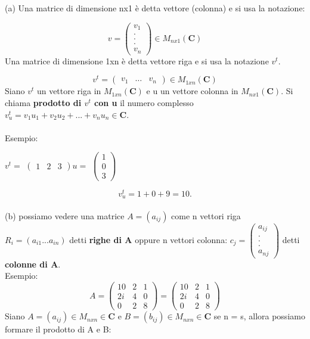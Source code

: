\documentclass[12pt]{article}
\begin{document}
(a) Una matrice di dimensione nx1 è detta vettore (colonna) e si usa la notazione:

\[v = \begin{pmatrix}
    v_1\\
    .\\
    .\\
    .\\
    v_n
\end{pmatrix} \in M_{nx1} (\mathbf{C})\]
Una matrice di dimensione 1xn è detta vettore riga e si usa la notazione $v^t$.

\[v^t = \begin{pmatrix}
    v_1 & \dots & v_n
\end{pmatrix} \in M_{1xn} (\mathbf{C})\]
Siano $v^t$ un vettore riga in $M_{1xn} (\mathbf{C})$ e u un vettore colonna in $M_{nx1} (\mathbf{C})$. Si chiama \textbf{prodotto di $v^t$ con u} il numero complesso $v^t_u = v_1u_1 + v_2u_2 + ... + v_nu_n \in \mathbf{C}$.
\\\\
Esempio:

\begin{center}
$v^t =$
$\begin{pmatrix}
  1 & 2 & 3
\end{pmatrix} u = $
$\begin{pmatrix}
    1\\
    0\\
    3
\end{pmatrix}$
\end{center}
\[v^t_u = 1 + 0 + 9 = 10.\]
\\
(b) possiamo vedere una matrice $A = (a_{ij})$ come n vettori riga $R_i = (a_{i1}...a_{in})$ detti \textbf{righe di A} oppure n vettori colonna: $c_j = \begin{pmatrix}
    a_{ij}\\
    .\\
    .\\
    .\\
    a_{nj}
\end{pmatrix}$ detti \textbf{colonne di A}.
\\
Esempio:
\[
A =
\begin{pmatrix}
    10 & 2 & 1\\
    2i & 4 & 0\\
    0 & 2 & 8
\end{pmatrix} =
\begin{pmatrix}
    10 & 2 & 1\\
    2i & 4 & 0\\
    0 & 2 & 8
\end{pmatrix}
\]
Siano $A = (a_{ij}) \in M_{nxn} \in \mathbf{C}$ e $B = (b_{ij}) \in M_{nxn} \in \mathbf{C}$ se n = s, allora possiamo formare il prodotto di A e B:
\end{document}
